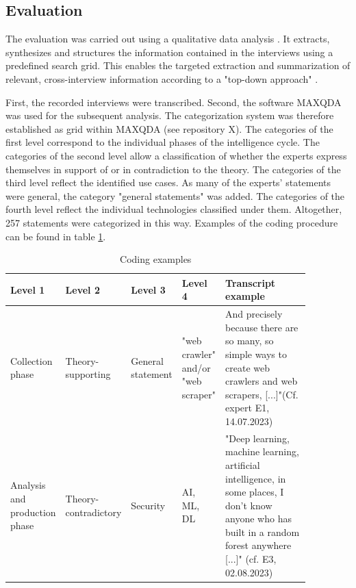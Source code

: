 \documentclass[10pt]{article}
\begin{document}
\subsection{Evaluation}

The evaluation was carried out using a qualitative data analysis \cite{Glaser.2009}.
It extracts, synthesizes and structures the information contained in the interviews
using a predefined search grid. This enables the targeted
extraction and summarization of relevant, cross-interview information
according to a "top-down approach" \cite{Bogner.2014, Glaser.2009}.

First, the recorded interviews were transcribed. Second, the software
MAXQDA was used for the subsequent analysis.
The categorization system was therefore established as grid within MAXQDA
(see repository X). The categories of the first level correspond to
the individual phases of the intelligence cycle. The categories of the
second level allow a classification of whether the experts express
themselves in support of or in contradiction to the theory. The
categories of the third level reflect the identified use cases.
As many of the experts' statements were general, the
category "general statements" was added. The categories
of the fourth level reflect the individual technologies classified
under them. Altogether, 257 statements were categorized in this way. Examples of the coding
procedure can be found in table \ref{tab:coding}.

\begin{table}[htbp]
    \caption{Coding examples}
    \label{tab:coding}
    \begin{tabular*}{\textwidth}{|p{0.12\linewidth}|p{0.12\linewidth}|p{0.12\linewidth}|p{0.12\linewidth}|p{0.39\linewidth}|}
        \hline
        \textbf{Level 1} & \textbf{Level 2} & \textbf{Level 3} & \textbf{Level 4} & \textbf{Transcript example} \\
        \hline
        Collection phase & Theory- supporting & General statement & "web crawler" and/or "web scraper" & And precisely because there are so many, so simple ways to create web crawlers and web scrapers, [...]"(Cf. expert E1, 14.07.2023) \\
        \hline
        Analysis and production phase & Theory- contradictory & Security & AI, ML, DL & "Deep learning, machine learning, artificial intelligence, in some places, I don't know anyone who has built in a random forest anywhere [...]" (cf. E3, 02.08.2023) \\
        \hline
    \end{tabular*}
\end{table}
\end{document}
